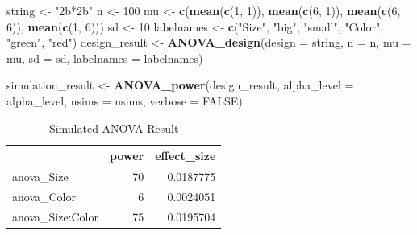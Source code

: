 \documentclass[]{book}
\newenvironment{Shaded}{\begin{snugshade}}{\end{snugshade}}
\newcommand{\DataTypeTok}[1]{\textcolor[rgb]{0.13,0.29,0.53}{#1}}
\newcommand{\DecValTok}[1]{\textcolor[rgb]{0.00,0.00,0.81}{#1}}
\newcommand{\KeywordTok}[1]{\textcolor[rgb]{0.13,0.29,0.53}{\textbf{#1}}}
\newcommand{\NormalTok}[1]{#1}
\newcommand{\OtherTok}[1]{\textcolor[rgb]{0.56,0.35,0.01}{#1}}
\newcommand{\StringTok}[1]{\textcolor[rgb]{0.31,0.60,0.02}{#1}}
\begin{document}
\begin{Shaded}
\begin{Highlighting}[]
\NormalTok{string <-}\StringTok{ "2b*2b"}
\NormalTok{n <-}\StringTok{ }\DecValTok{100}
\NormalTok{mu <-}\StringTok{ }\KeywordTok{c}\NormalTok{(}\KeywordTok{mean}\NormalTok{(}\KeywordTok{c}\NormalTok{(}\DecValTok{1}\NormalTok{, }\DecValTok{1}\NormalTok{)), }\KeywordTok{mean}\NormalTok{(}\KeywordTok{c}\NormalTok{(}\DecValTok{6}\NormalTok{, }\DecValTok{1}\NormalTok{)), }\KeywordTok{mean}\NormalTok{(}\KeywordTok{c}\NormalTok{(}\DecValTok{6}\NormalTok{, }\DecValTok{6}\NormalTok{)), }\KeywordTok{mean}\NormalTok{(}\KeywordTok{c}\NormalTok{(}\DecValTok{1}\NormalTok{, }\DecValTok{6}\NormalTok{)))}
\NormalTok{sd <-}\StringTok{ }\DecValTok{10}
\NormalTok{labelnames <-}\StringTok{ }\KeywordTok{c}\NormalTok{(}\StringTok{"Size"}\NormalTok{, }\StringTok{"big"}\NormalTok{, }\StringTok{"small"}\NormalTok{, }\StringTok{"Color"}\NormalTok{, }\StringTok{"green"}\NormalTok{, }\StringTok{"red"}\NormalTok{)}
\NormalTok{design_result <-}\StringTok{ }\KeywordTok{ANOVA_design}\NormalTok{(}\DataTypeTok{design =}\NormalTok{ string,}
                   \DataTypeTok{n =}\NormalTok{ n, }
                   \DataTypeTok{mu =}\NormalTok{ mu, }
                   \DataTypeTok{sd =}\NormalTok{ sd, }
                   \DataTypeTok{labelnames =}\NormalTok{ labelnames)}

\NormalTok{simulation_result <-}\StringTok{ }\KeywordTok{ANOVA_power}\NormalTok{(design_result, }
                                 \DataTypeTok{alpha_level =}\NormalTok{ alpha_level, }
                                 \DataTypeTok{nsims =}\NormalTok{ nsims,}
                                 \DataTypeTok{verbose =} \OtherTok{FALSE}\NormalTok{)}
\end{Highlighting}
\end{Shaded}

\begin{table}[t]

\caption{\label{tab:unnamed-chunk-140}Simulated ANOVA Result}
\centering
\begin{tabular}{l|r|r}
\hline
  & power & effect\_size\\
\hline
anova\_Size & 70 & 0.0187775\\
\hline
anova\_Color & 6 & 0.0024051\\
\hline
anova\_Size:Color & 75 & 0.0195704\\
\hline
\end{tabular}
\end{table}
\end{document}
